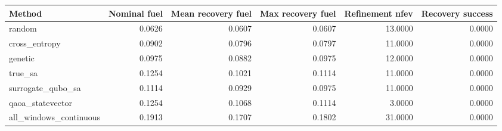 \begin{tabular}{lrrrrr}
\toprule
Method & Nominal fuel & Mean recovery fuel & Max recovery fuel & Refinement nfev & Recovery success \\
\midrule
random & 0.0626 & 0.0607 & 0.0607 & 13.0000 & 0.0000 \\
cross\_entropy & 0.0902 & 0.0796 & 0.0797 & 11.0000 & 0.0000 \\
genetic & 0.0975 & 0.0882 & 0.0975 & 12.0000 & 0.0000 \\
true\_sa & 0.1254 & 0.1021 & 0.1114 & 11.0000 & 0.0000 \\
surrogate\_qubo\_sa & 0.1114 & 0.0929 & 0.0975 & 11.0000 & 0.0000 \\
qaoa\_statevector & 0.1254 & 0.1068 & 0.1114 & 3.0000 & 0.0000 \\
all\_windows\_continuous & 0.1913 & 0.1707 & 0.1802 & 31.0000 & 0.0000 \\
\bottomrule
\end{tabular}
